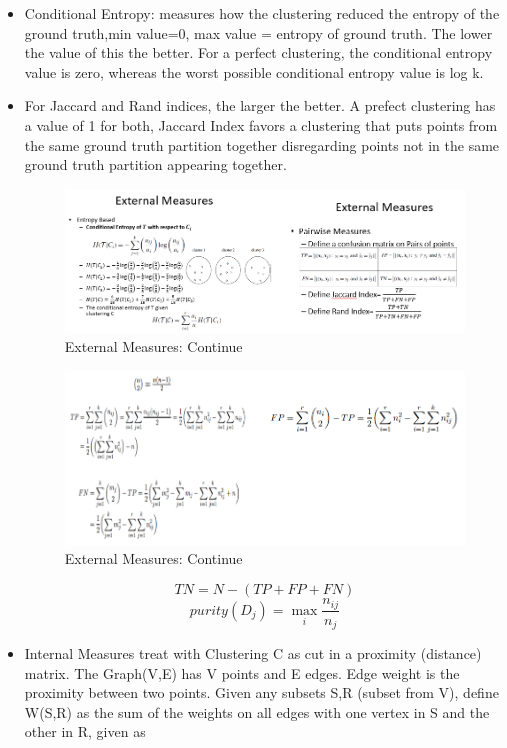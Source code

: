 \begin{itemize}
    \item Conditional Entropy: measures how the clustering reduced the entropy of the ground truth,min value=0, max value = entropy of ground truth. The lower the value of this the better. For a perfect clustering, the conditional entropy value is zero, whereas the worst possible conditional entropy value is log k.
    \item For Jaccard and Rand indices, the larger the better. A prefect clustering has a value of 1 for both, Jaccard Index favors a clustering that puts points from the same ground truth partition together disregarding points not in the same ground truth partition appearing together.
    \begin{figure}[H]
        \centerline{\includegraphics[width=1.5\textwidth]{Figures/externalmes2.png}}
        \caption{\label{fig:figure12}External Measures: Continue}
    \end{figure}
    \begin{figure}[H]
        \centerline{\includegraphics[width=1.5\textwidth]{Figures/externalmes3.png}}
        \caption{\label{fig:figure13}External Measures: Continue}
    \end{figure}
    $$TN = N- (TP + FP + FN)$$
    \[ purity(D_j) = \operatorname*{max}_i {\frac{n_{ij}}{n_j}}\] 
    \newpage
    \item Internal Measures treat with Clustering C as cut in a proximity (distance) matrix. The Graph(V,E) has V points and E edges. Edge weight is the proximity between two points. Given any subsets S,R (subset from V), define W(S,R) as the sum of the weights on all edges with one vertex in S and the other in R, given as

\end{itemize}

